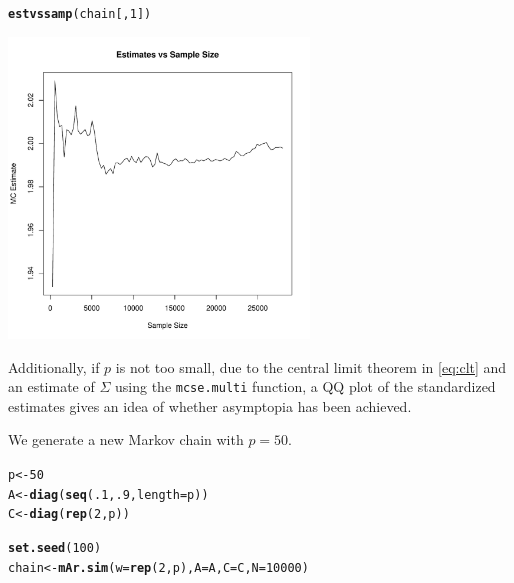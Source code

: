 \documentclass[11pt]{article}\usepackage[]{graphicx}\usepackage[]{color}
\makeatletter
\newcommand{\hlnum}[1]{\textcolor[rgb]{0.686,0.059,0.569}{#1}}%
\newcommand{\hlstd}[1]{\textcolor[rgb]{0.345,0.345,0.345}{#1}}%
\newcommand{\hlkwb}[1]{\textcolor[rgb]{0.69,0.353,0.396}{#1}}%
\newcommand{\hlkwc}[1]{\textcolor[rgb]{0.333,0.667,0.333}{#1}}%
\newcommand{\hlkwd}[1]{\textcolor[rgb]{0.737,0.353,0.396}{\textbf{#1}}}%
\newenvironment{kframe}{%
 \def\at@end@of@kframe{}%
 \ifinner\ifhmode%
  \def\at@end@of@kframe{\end{minipage}}%
  \begin{minipage}{\columnwidth}%
 \fi\fi%
 \def\FrameCommand##1{\hskip\@totalleftmargin \hskip-\fboxsep
 \colorbox{shadecolor}{##1}\hskip-\fboxsep
     \hskip-\linewidth \hskip-\@totalleftmargin \hskip\columnwidth}%
 \MakeFramed {\advance\hsize-\width
   \@totalleftmargin\z@ \linewidth\hsize
   \@setminipage}}%
 {\par\unskip\endMakeFramed%
 \at@end@of@kframe}
\newenvironment{knitrout}{}{} %
\makeatother
\begin{document}
\begin{knitrout}
\color{fgcolor}\begin{kframe}
\begin{alltt}
\hlkwd{estvssamp}\hlstd{(chain[,}\hlnum{1}\hlstd{])}
\end{alltt}
\end{kframe}
\includegraphics[width=8cm]{figure/estvssamp-1} 

\end{knitrout}

Additionally, if $p$ is not too small, due to the central limit theorem in \eqref{eq:clt} and an estimate of $\Sigma$ using the \texttt{mcse.multi} function, a QQ plot of the standardized estimates gives an idea of whether asymptopia has been achieved.

We generate a new Markov chain with $p = 50$.

\begin{knitrout}
\color{fgcolor}\begin{kframe}
\begin{alltt}
\hlstd{p} \hlkwb{<-} \hlnum{50}
\hlstd{A} \hlkwb{<-} \hlkwd{diag}\hlstd{(}\hlkwd{seq}\hlstd{(}\hlnum{.1}\hlstd{,} \hlnum{.9}\hlstd{,} \hlkwc{length} \hlstd{= p))}
\hlstd{C} \hlkwb{<-} \hlkwd{diag}\hlstd{(}\hlkwd{rep}\hlstd{(}\hlnum{2}\hlstd{, p))}

\hlkwd{set.seed}\hlstd{(}\hlnum{100}\hlstd{)}
\hlstd{chain} \hlkwb{<-} \hlkwd{mAr.sim}\hlstd{(}\hlkwc{w} \hlstd{=} \hlkwd{rep}\hlstd{(}\hlnum{2}\hlstd{,p),} \hlkwc{A} \hlstd{= A,} \hlkwc{C} \hlstd{= C,} \hlkwc{N} \hlstd{=} \hlnum{10000}\hlstd{)}
\end{alltt}
\end{kframe}
\end{knitrout}
\end{document}
